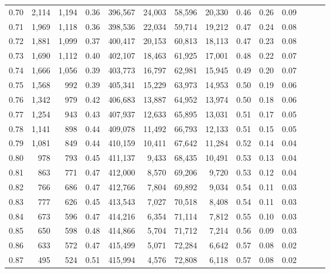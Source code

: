 \begin{tabular}{rrrrrrrrrrrrrr}
0.70 &   2,114 &  1,194 &  0.36 &  396,567 &   24,003 &  58,596 &  20,330 &  0.46 &  0.26 &      0.09 \\
0.71 &   1,969 &  1,118 &  0.36 &  398,536 &   22,034 &  59,714 &  19,212 &  0.47 &  0.24 &      0.08 \\
0.72 &   1,881 &  1,099 &  0.37 &  400,417 &   20,153 &  60,813 &  18,113 &  0.47 &  0.23 &      0.08 \\
0.73 &   1,690 &  1,112 &  0.40 &  402,107 &   18,463 &  61,925 &  17,001 &  0.48 &  0.22 &      0.07 \\
0.74 &   1,666 &  1,056 &  0.39 &  403,773 &   16,797 &  62,981 &  15,945 &  0.49 &  0.20 &      0.07 \\
0.75 &   1,568 &    992 &  0.39 &  405,341 &   15,229 &  63,973 &  14,953 &  0.50 &  0.19 &      0.06 \\
0.76 &   1,342 &    979 &  0.42 &  406,683 &   13,887 &  64,952 &  13,974 &  0.50 &  0.18 &      0.06 \\
0.77 &   1,254 &    943 &  0.43 &  407,937 &   12,633 &  65,895 &  13,031 &  0.51 &  0.17 &      0.05 \\
0.78 &   1,141 &    898 &  0.44 &  409,078 &   11,492 &  66,793 &  12,133 &  0.51 &  0.15 &      0.05 \\
0.79 &   1,081 &    849 &  0.44 &  410,159 &   10,411 &  67,642 &  11,284 &  0.52 &  0.14 &      0.04 \\
0.80 &     978 &    793 &  0.45 &  411,137 &    9,433 &  68,435 &  10,491 &  0.53 &  0.13 &      0.04 \\
0.81 &     863 &    771 &  0.47 &  412,000 &    8,570 &  69,206 &   9,720 &  0.53 &  0.12 &      0.04 \\
0.82 &     766 &    686 &  0.47 &  412,766 &    7,804 &  69,892 &   9,034 &  0.54 &  0.11 &      0.03 \\
0.83 &     777 &    626 &  0.45 &  413,543 &    7,027 &  70,518 &   8,408 &  0.54 &  0.11 &      0.03 \\
0.84 &     673 &    596 &  0.47 &  414,216 &    6,354 &  71,114 &   7,812 &  0.55 &  0.10 &      0.03 \\
0.85 &     650 &    598 &  0.48 &  414,866 &    5,704 &  71,712 &   7,214 &  0.56 &  0.09 &      0.03 \\
0.86 &     633 &    572 &  0.47 &  415,499 &    5,071 &  72,284 &   6,642 &  0.57 &  0.08 &      0.02 \\
0.87 &     495 &    524 &  0.51 &  415,994 &    4,576 &  72,808 &   6,118 &  0.57 &  0.08 &      0.02 \\

\end{tabular}
